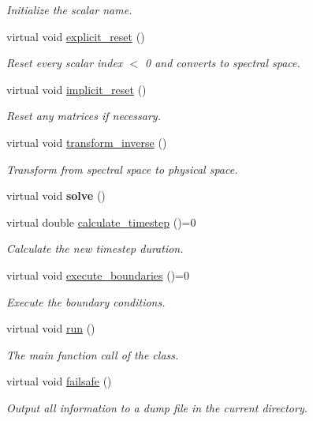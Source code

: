 \begin{DoxyCompactItemize}
\begin{DoxyCompactList}\small\item\em Initialize the scalar name. \end{DoxyCompactList}\item 
virtual void \hyperlink{classbases_1_1element_ac2a829e5dc54ab249d8b567f608e7f69}{explicit\-\_\-reset} ()
\begin{DoxyCompactList}\small\item\em Reset every scalar index $<$ 0 and converts to spectral space. \end{DoxyCompactList}\item 
virtual void \hyperlink{classbases_1_1element_a0311b32b397accaba0b9066c6c402274}{implicit\-\_\-reset} ()
\begin{DoxyCompactList}\small\item\em Reset any matrices if necessary. \end{DoxyCompactList}\item 
virtual void \hyperlink{classbases_1_1element_aebdb8f7c290f78cc9e9abb019e96eeaf}{transform\-\_\-inverse} ()
\begin{DoxyCompactList}\small\item\em Transform from spectral space to physical space. \end{DoxyCompactList}\item 
\hypertarget{classbases_1_1element_acd5b77ded6283aec184192d313ee17e8}{virtual void {\bfseries solve} ()}\label{classbases_1_1element_acd5b77ded6283aec184192d313ee17e8}

\item 
virtual double \hyperlink{classbases_1_1element_aa8a344e596bf8cee3fdeda611b98bb1c}{calculate\-\_\-timestep} ()=0
\begin{DoxyCompactList}\small\item\em Calculate the new timestep duration. \end{DoxyCompactList}\item 
virtual void \hyperlink{classbases_1_1element_a86a15277a82abbc28ba75f67817e170a}{execute\-\_\-boundaries} ()=0
\begin{DoxyCompactList}\small\item\em Execute the boundary conditions. \end{DoxyCompactList}\item 
virtual void \hyperlink{classbases_1_1element_a4a8ef296f0853fc3e1941b696eee7dc9}{run} ()
\begin{DoxyCompactList}\small\item\em The main function call of the class. \end{DoxyCompactList}\item 
virtual void \hyperlink{classbases_1_1element_a8924e3a51b3c02433c082ebbb94c47d0}{failsafe} ()
\begin{DoxyCompactList}\small\item\em Output all information to a dump file in the current directory. \end{DoxyCompactList}\end{DoxyCompactItemize}
